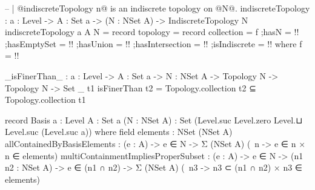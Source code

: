 \begin{code}
-- | @indiscreteTopology n@ is an indiscrete topology on @N@.
indiscreteTopology : {a : Level} ->
                     {A : Set a} ->
                     (N : NSet A) ->
                     IndiscreteTopology N
indiscreteTopology {a} {A} N = record
  {topology = record
     {collection = f
     ;hasN = {!!}
     ;hasEmptySet = {!!}
     ;hasUnion = {!!}
     ;hasIntersection = {!!}
     }
  ;isIndiscrete = {!!}}
  where
  f = {!!}
  
_isFinerThan_ : {a : Level} ->
                {A : Set a} ->
                {N : NSet A} ->
                Topology N ->
                Topology N ->
                Set _
t1 isFinerThan t2 = Topology.collection t2 ⊆ Topology.collection t1

record Basis {a : Level}
             {A : Set a}
             (N : NSet A) : Set (Level.suc Level.zero Level.⊔ Level.suc (Level.suc a)) where
  field
   elements : NSet (NSet A)
   allContainedByBasisElements :
     (e : A) ->
     e ∈ N ->
     Σ (NSet A) (\ n -> e ∈ n × n ∈ elements)
   multiContainmentImpliesProperSubset :
     (e : A) ->
     e ∈ N ->
     (n1 n2 : NSet A) ->
     e ∈ (n1 ∩ n2) ->
     Σ (NSet A) (\ n3 -> n3 ⊂ (n1 ∩ n2) × n3 ∈ elements)
\end{code}
